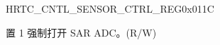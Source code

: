 \begin{register}{H}{RTC\_CNTL\_SENSOR\_CTRL\_REG}{0x011C}\label{regdesc:RTCCNTLSENSORCTRLREG}
%
%
%
\regnewline%
\begin{regdesc}\begin{reglist}
\label{fielddesc:RTCCNTLFORCEXPDSAR}\item [RTC\_CNTL\_FORCE\_XPD\_SAR] 置 1 强制打开 SAR ADC。(R/W)
\end{reglist}\end{regdesc}
\end{register}
